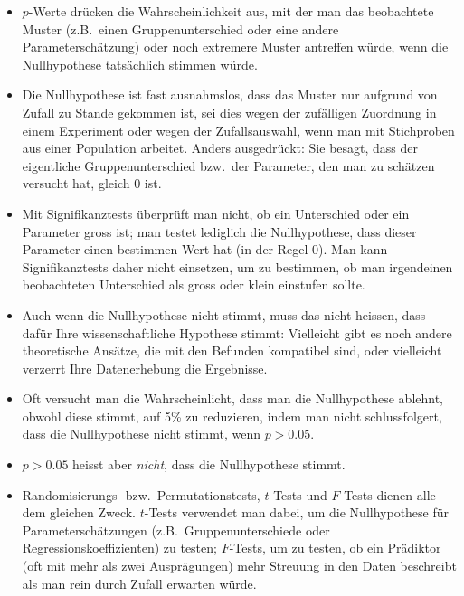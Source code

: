 \documentclass[oneside, 10pt]{book}\usepackage[]{graphicx}\usepackage[]{xcolor}
\begin{document}
\begin{itemize}
 \item $p$-Werte drücken die Wahrscheinlichkeit aus, mit der man das beobachtete
 Muster (z.B.\ einen Gruppenunterschied oder eine andere Parameterschätzung)
 oder noch extremere Muster antreffen würde, wenn die Nullhypothese tatsächlich
 stimmen würde.

 \item Die Nullhypothese ist fast ausnahmslos, dass das Muster nur aufgrund von
 Zufall zu Stande gekommen ist, sei dies wegen der zufälligen Zuordnung in
 einem Experiment oder wegen der Zufallsauswahl, wenn man mit Stichproben
 aus einer Population arbeitet. Anders ausgedrückt: Sie besagt, dass der eigentliche
 Gruppenunterschied bzw.\ der Parameter, den man zu schätzen versucht hat,
 gleich 0 ist.

 \item Mit Signifikanztests überprüft man nicht, ob ein Unterschied oder ein Parameter gross ist; man testet lediglich die Nullhypothese, dass dieser Parameter einen bestimmen Wert hat (in der Regel 0). Man kann Signifikanztests
 daher nicht einsetzen, um zu bestimmen, ob man irgendeinen beobachteten
 Unterschied als gross oder klein einstufen sollte.

 \item Auch wenn die Nullhypothese nicht stimmt, muss das nicht heissen,
 dass dafür Ihre wissenschaftliche Hypothese stimmt: Vielleicht gibt es
 noch andere theoretische Ansätze, die mit den Befunden kompatibel sind,
 oder vielleicht verzerrt Ihre Datenerhebung die Ergebnisse.

 \item Oft versucht man die Wahrscheinlicht, dass man die Nullhypothese
 ablehnt, obwohl diese stimmt, auf 5\% zu reduzieren, indem
 man nicht schlussfolgert, dass die Nullhypothese nicht stimmt, wenn $p > 0.05$.

 \item $p > 0.05$ heisst aber \emph{nicht}, dass die Nullhypothese stimmt.

 \item Randomisierungs- bzw.\ Permutationstests, $t$-Tests und $F$-Tests dienen alle dem gleichen
 Zweck. $t$-Tests verwendet man dabei, um die Nullhypothese für Parameterschätzungen
 (z.B.\ Gruppenunterschiede oder Regressionskoeffizienten) zu testen;
 $F$-Tests, um zu testen, ob ein Prädiktor (oft mit mehr als zwei Ausprägungen)
 mehr Streuung in den Daten beschreibt als man rein durch Zufall erwarten würde.


\end{itemize}
\end{document}
